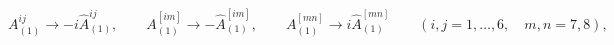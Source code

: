 \begin{equation}
A_{(1)}^{ij}\to -i\hat A_{(1)}^{ij},\qquad
A_{(1)}^{[im]}\to -\hat A_{(1)}^{[im]},\qquad
A_{(1)}^{[mn]}\to i\hat A_{(1)}^{[mn]}\qquad
(i,j=1,\ldots,6,\quad m,n=7,8),
\end{equation}

